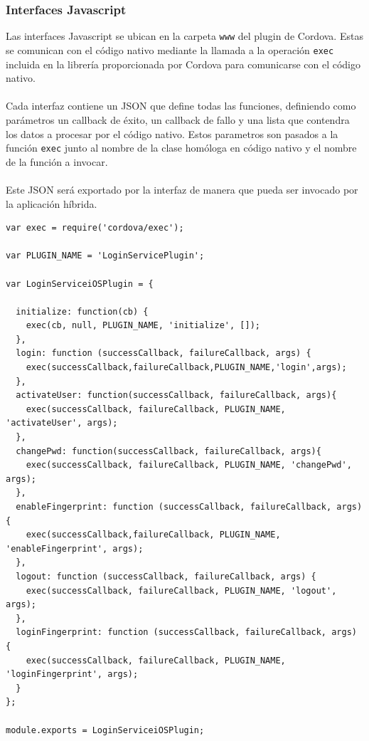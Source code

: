 \documentclass[a4paper, 12pt]{article}
\newenvironment{code}{\captionsetup{type=listing}}{}
\begin{document}
\subsubsection{Interfaces Javascript}
\label{sec-4-3-4}
Las interfaces Javascript se ubican en la carpeta \verb~www~ del plugin de Cordova. Estas se comunican con el código nativo mediante la llamada a la operación \verb~exec~ incluida en la librería proporcionada por Cordova
para comunicarse con el código nativo.
\\
\\
Cada interfaz contiene un JSON que define todas las funciones, definiendo como parámetros un callback de éxito, un callback de fallo y una lista que contendra los datos a procesar por el código nativo. Estos parametros
son pasados a la función \verb~exec~ junto al nombre de la clase homóloga en código nativo y el nombre de la función a invocar.
\\
\\
Este JSON será exportado por la interfaz de manera que pueda ser invocado por la aplicación híbrida.
\begin{code}
\label{code:js-interface}
\begin{verbatim}
var exec = require('cordova/exec');

var PLUGIN_NAME = 'LoginServicePlugin';

var LoginServiceiOSPlugin = {

  initialize: function(cb) {
    exec(cb, null, PLUGIN_NAME, 'initialize', []);
  },
  login: function (successCallback, failureCallback, args) {
    exec(successCallback,failureCallback,PLUGIN_NAME,'login',args);
  },
  activateUser: function(successCallback, failureCallback, args){
    exec(successCallback, failureCallback, PLUGIN_NAME, 'activateUser', args);
  },
  changePwd: function(successCallback, failureCallback, args){
    exec(successCallback, failureCallback, PLUGIN_NAME, 'changePwd', args);
  },
  enableFingerprint: function (successCallback, failureCallback, args) {
    exec(successCallback,failureCallback, PLUGIN_NAME, 'enableFingerprint', args);
  },
  logout: function (successCallback, failureCallback, args) {
    exec(successCallback, failureCallback, PLUGIN_NAME, 'logout', args);
  },
  loginFingerprint: function (successCallback, failureCallback, args) {
    exec(successCallback, failureCallback, PLUGIN_NAME, 'loginFingerprint', args);
  }
};

module.exports = LoginServiceiOSPlugin;

\end{verbatim}
\end{code}
\end{document}
